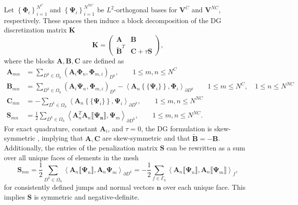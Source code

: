 \documentclass[preprint,10pt]{elsarticle}
\newcommand{\LRp}[1]{\left( #1 \right)}
\newcommand{\LRa}[1]{\left\langle #1 \right\rangle}
\newcommand{\LRc}[1]{\left\{ #1 \right\}}
\newcommand{\jump}[1] {\ensuremath{\llbracket#1\rrbracket}}
\newcommand{\avg}[1] {\ensuremath{\LRc{\!\{#1\}\!}}}
\newcommand{\Gh}{\Gamma_h}
\newcommand{\Oh}{\Omega_h}
\begin{document}
Let $\LRc{\bm{\Phi}_i }_{i=1}^{N^{C}}$ and $\LRc{\bm{\Psi}_i }_{i=1}^{N^{NC}}$ be $L^2$-orthogonal bases for $\bm{V}^C$ and $\bm{V}^{NC}$, respectively.  These spaces then induce a block decomposition of the DG discretization matrix $\bm{K}$
\begin{equation}
\bm{K} = \left(\begin{array}{cc}
\bm{A} & \bm{B}\\
\tilde{\bm{B}}^T & \bm{C} + \tau \bm{S}
\end{array}\right),
\label{eq:block}
\end{equation}
where the blocks $\bm{A},\bm{B},\bm{C}$ are defined as
\begin{align*}
\bm{A}_{mn} &= \sum_{D^k\in \Oh} \LRp{\bm{A}_i\bm{\Phi}_n, \bm{\Phi}_{m,i}}_{D^k}, \qquad 1\leq m,n \leq N^C\\
\bm{B}_{mn} &= \sum_{D^k\in \Oh} \LRp{\bm{A}_i\bm{\Psi}_n, \bm{\Phi}_{m,i}}_{D^k} - \LRa{\bm{A}_n\avg{\bm{\Psi}_i}, {\bm{\Phi}_i}}_{\partial D^k} \qquad 1\leq m \leq N^C, \quad 1\leq n \leq N^{NC} \\
\bm{C}_{mn}  &= -\sum_{D^k\in \Oh} \LRa{\bm{A}_n\avg{\bm{\Psi}_i}, {\bm{\Psi}_i}}_{\partial D^k}, \qquad 1 \leq m,n \leq N^{NC}\\
\bm{S}_{mn}  &= \frac{1}{2}\sum_{D^k\in \Oh} \LRa{\bm{A}_n^T\bm{A}_n\jump{ \bm{\Psi_n}}, {\bm{\Psi}_m}}_{\partial D^k}, \qquad 1 \leq m,n \leq N^{NC}.  
\end{align*}
For exact quadrature, constant $\bm{A}_i$, and $\tau = 0$, the DG formulation is skew-symmetric \cite{warburton2013low, chan2015gpu, chan2016weight2, kopriva2014energy}, implying that $\bm{A},\bm{C}$ are skew-symmetric and that $\tilde{\bm{B}} = -\bm{B}$.  Additionally, the entries of the penalization matrix $\bm{S}$ can be rewritten as a sum over all unique faces of elements in the mesh
\[
\bm{S}_{mn} = \frac{1}{2}\sum_{D^k\in \Oh} \LRa{\bm{A}_n\jump{ \bm{\Psi}_n}, \bm{A}_n{\bm{\Psi}_m}}_{\partial D^k} = -\frac{1}{2}\sum_{f \in \Gh} \LRa{\bm{A}_n\jump{ \bm{\Psi}_n}, \bm{A}_n\jump{{\bm{\Psi}_m}}}_{f},
\]
for consistently defined jumps and normal vectors $\bm{n}$  over each unique face.  This implies $\bm{S}$ is symmetric and negative-definite.  
\end{document}
